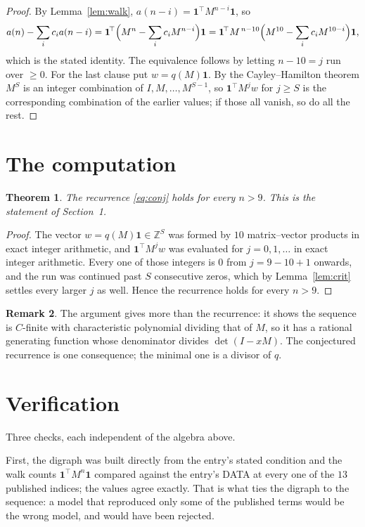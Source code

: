 \documentclass[11pt,a4paper]{article}
\theoremstyle{plain}
\newtheorem{theorem}{Theorem}
\theoremstyle{definition}
\newtheorem{remark}[theorem]{Remark}
\begin{document}
\begin{proof}
By Lemma~\ref{lem:walk}, $a(n-i)=\mathbf{1}^{\!\top}M^{n-i}\mathbf{1}$, so
\[
a(n)-\sum_i c_i a(n-i)
=\mathbf{1}^{\!\top}\Bigl(M^{n}-\sum_i c_i M^{n-i}\Bigr)\mathbf{1}
=\mathbf{1}^{\!\top}M^{\,n-10}\Bigl(M^{10}-\sum_i c_i M^{10-i}\Bigr)\mathbf{1},
\]
which is the stated identity. The equivalence follows by letting $n-10=j$ run over
$\ge0$. For the last clause put $w=q(M)\mathbf{1}$. By the Cayley--Hamilton theorem
$M^{S}$ is an integer combination of $I,M,\dots,M^{S-1}$, so
$\mathbf{1}^{\!\top}M^{j}w$ for $j\ge S$ is the corresponding combination of the
earlier values; if those all vanish, so do all the rest.
\end{proof}

\section{The computation}

\begin{theorem}
The recurrence \eqref{eq:conj} holds for every $n>9$. This is the statement of
Section~1.
\end{theorem}

\begin{proof}
The vector $w=q(M)\mathbf{1}\in\mathbb{Z}^{S}$ was formed by $10$ matrix--vector
products in exact integer arithmetic, and $\mathbf{1}^{\!\top}M^{j}w$ was evaluated for
$j=0,1,\dots$ in exact integer arithmetic. Every one of those integers is $0$ from
$j=9-10+1$ onwards, and the run was continued past $S$ consecutive zeros, which by
Lemma~\ref{lem:crit} settles every larger $j$ as well. Hence the recurrence holds for
every $n>9$.
\end{proof}

\begin{remark}
The argument gives more than the recurrence: it shows the sequence is $C$-finite with
characteristic polynomial dividing that of $M$, so it has a rational generating function
whose denominator divides $\det(I-xM)$. The conjectured recurrence is one consequence; the
minimal one is a divisor of $q$.
\end{remark}

\section{Verification}

Three checks, each independent of the algebra above.

First, the digraph was built directly from the entry's stated condition and the walk counts
$\mathbf{1}^{\!\top}M^{n}\mathbf{1}$ compared against the entry's DATA at every one of
the $13$ published indices; the values agree exactly. That is what ties the digraph to
the sequence: a model that reproduced only some of the published terms would be the wrong
model, and would have been rejected.
\end{document}

